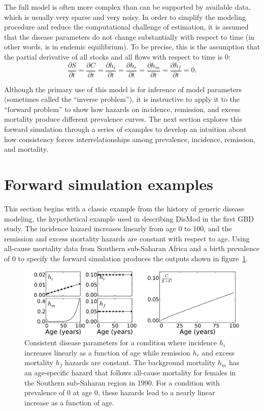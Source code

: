 The full model is often more complex than can be supported by
available data, which is usually very sparse and very noisy.  In order
to simplify the modeling procedure and reduce the computational challenge
of estimation, it is assumed that the disease parameters do not change
substantially with respect to time (in other words, is in endemic equilibrium). To be precise, this is the assumption
that the partial derivative of all stocks and all flows with respect
to time is $0$:
\[
\frac{\partial S}{\partial t}
=
\frac{\partial C}{\partial t}
=
\frac{\partial h_i}{\partial t}
=
\frac{\partial h_r}{\partial t}
=
\frac{\partial h_m}{\partial t}
=
\frac{\partial h_f}{\partial t}
=
0.
\]

Although the primary use of this model is for inference of model
parameters (sometimes called the ``inverse problem''), it is
instructive to apply it to the ``forward problem'' to show how hazards on incidence,
remission, and excess mortality produce different prevalence
curves. The next section explores this forward simulation through a
series of examples to develop an intuition about how consistency
forces interrelationships among prevalence, incidence, remission,
and mortality.


\section{Forward simulation examples}

This section begins with a classic example from the history of generic
disease modeling, the hypothetical example used in describing DisMod
in the first GBD study.\cite{murray_global_1996}
The incidence hazard increases linearly from age $0$ to
$100$, and the remission and excess mortality hazards are constant with
respect to age.  Using all-cause mortality data from Southern sub-Saharan
Africa and a birth prevalence of $0$ to specify
the forward simulation produces the outputs shown in
figure~\ref{forward-sim-ex1}.

\begin{figure}[htb]
\begin{center}
\includegraphics[width=\textwidth]{initial.pdf}
\caption[Consistent disease parameters for a condition.]{Consistent
  disease parameters for a condition where incidence
  $h_i$ increases linearly as a function of age while remission
  $h_r$ and excess mortality $h_f$ hazards are constant. The
  background mortality $h_m$ has an age-specific hazard that follows
  all-cause mortality for females in the Southern sub-Saharan region
  in 1990. For a condition with prevalence of $0$ at age $0$, these
  hazards lead to a nearly linear increase as a function of age.}
\label{forward-sim-ex1}
\end{center}
\end{figure}

